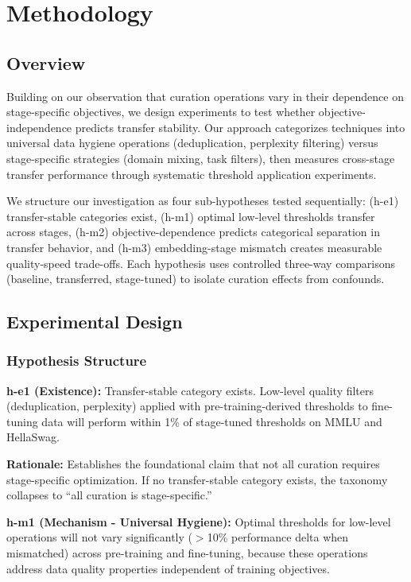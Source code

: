\section{Methodology}

\subsection{Overview}

Building on our observation that curation operations vary in their dependence on stage-specific objectives, we design experiments to test whether objective-independence predicts transfer stability. Our approach categorizes techniques into universal data hygiene operations (deduplication, perplexity filtering) versus stage-specific strategies (domain mixing, task filters), then measures cross-stage transfer performance through systematic threshold application experiments.

We structure our investigation as four sub-hypotheses tested sequentially: (h-e1) transfer-stable categories exist, (h-m1) optimal low-level thresholds transfer across stages, (h-m2) objective-dependence predicts categorical separation in transfer behavior, and (h-m3) embedding-stage mismatch creates measurable quality-speed trade-offs. Each hypothesis uses controlled three-way comparisons (baseline, transferred, stage-tuned) to isolate curation effects from confounds.

\subsection{Experimental Design}

\subsubsection{Hypothesis Structure}

\textbf{h-e1 (Existence):} Transfer-stable category exists. Low-level quality filters (deduplication, perplexity) applied with pre-training-derived thresholds to fine-tuning data will perform within 1\% of stage-tuned thresholds on MMLU and HellaSwag.

\textbf{Rationale:} Establishes the foundational claim that not all curation requires stage-specific optimization. If no transfer-stable category exists, the taxonomy collapses to ``all curation is stage-specific.''

\textbf{h-m1 (Mechanism - Universal Hygiene):} Optimal thresholds for low-level operations will not vary significantly ($>$10\% performance delta when mismatched) across pre-training and fine-tuning, because these operations address data quality properties independent of training objectives.

